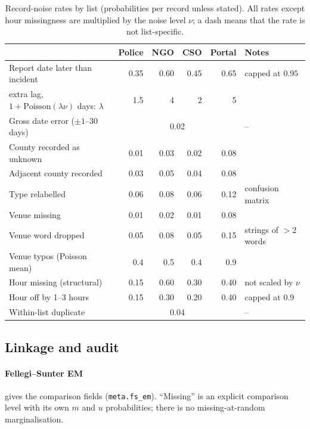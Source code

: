 \begin{table}[tp]
\centering
\caption{Record-noise rates by list (probabilities per record unless stated). All rates except hour missingness are multiplied by the noise level $\nu$; a dash means that the rate is not list-specific.}\label{tab:sim-noise}
\small
\begin{tabular}{@{}lrrrrl@{}}
\toprule
 & Police & NGO & CSO & Portal & Notes \\
\midrule
Report date later than incident & 0.35 & 0.60 & 0.45 & 0.65 & capped at $0.95$ \\
\quad extra lag, $1+\mathrm{Poisson}(\lambda\nu)$ days: $\lambda$ & 1.5 & 4 & 2 & 5 & \\
Gross date error ($\pm1$--$30$ days) & \multicolumn{4}{c}{0.02} & -- \\
County recorded as unknown & 0.01 & 0.03 & 0.02 & 0.08 & \\
Adjacent county recorded & 0.03 & 0.05 & 0.04 & 0.08 & \\
Type relabelled & 0.06 & 0.08 & 0.06 & 0.12 & confusion matrix \\
Venue missing & 0.01 & 0.02 & 0.01 & 0.08 & \\
Venue word dropped & 0.05 & 0.08 & 0.05 & 0.15 & strings of $>2$ words \\
Venue typos (Poisson mean) & 0.4 & 0.5 & 0.4 & 0.9 & \\
Hour missing (structural) & 0.15 & 0.60 & 0.30 & 0.40 & not scaled by $\nu$ \\
Hour off by 1--3 hours & 0.15 & 0.30 & 0.20 & 0.40 & capped at $0.9$ \\
Within-list duplicate & \multicolumn{4}{c}{0.04} & -- \\
\bottomrule
\end{tabular}
\end{table}

\subsection{Linkage and audit}\label{app:sim-linkage}

\paragraph{Fellegi--Sunter EM}  gives the comparison fields (\texttt{meta.fs\_em}). ``Missing'' is an explicit comparison level with its own $m$ and $u$ probabilities; there is no missing-at-random marginalisation.

